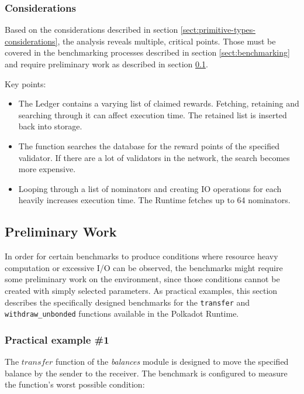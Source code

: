 \documentclass[11pt,a4paper]{article}
\begin{document}
\subsubsection*{Considerations}

Based on the considerations described in section \ref{sect:primitive-types-considerations},
the analysis reveals multiple, critical points. Those must be covered in the benchmarking
processes described in section \ref{sect:benchmarking} and require preliminary work as
described in section \ref{sect:examples-preliminary-work}.
\newline

Key points:

\begin{itemize}
  \item The Ledger contains a varying list of claimed rewards. Fetching, retaining and searching through it can affect execution
  time. The retained list is inserted back into storage.
  \item The function searches the database for the reward points of the specified validator. If there are a lot of validators
  in the network, the search becomes more expensive.
  \item Looping through a list of nominators and creating IO operations for each heavily increases execution time.
  The Runtime fetches up to 64 nominators.
\end{itemize}

\subsection{Preliminary Work}\label{sect:examples-preliminary-work}
In order for certain benchmarks to produce conditions where resource heavy computation or excessive
I/O can be observed, the benchmarks might require some preliminary work on the environment, since those
conditions cannot be created with simply selected parameters.
As practical examples, this section describes the specifically designed benchmarks for the \verb|transfer|
and \verb|withdraw_unbonded| functions available in the Polkadot Runtime.

\subsubsection{Practical example \#1}
The $transfer$ function of the \textit{balances} module is designed to move the specified balance by the sender to the receiver.
The benchmark is configured to measure the function's worst possible condition:
\end{document}
